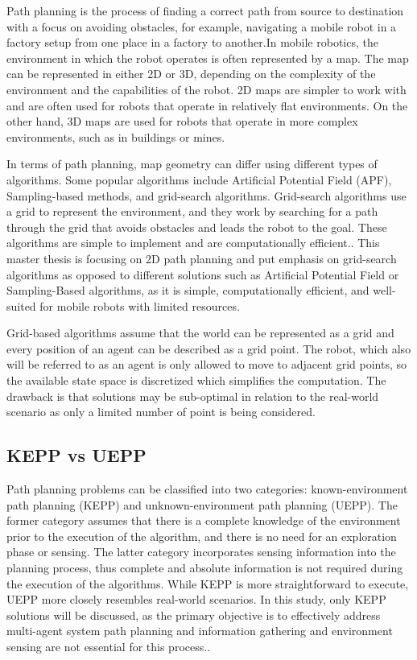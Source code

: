 Path planning is the process of finding a correct path from source to destination with a focus on avoiding obstacles, for example, navigating a mobile robot in a factory setup from one place in a factory to another\cite{path_planning}.In mobile robotics, the environment in which the robot operates is often represented by a map. The map can be represented in either 2D or 3D, depending on the complexity of the environment and the capabilities of the robot. 2D maps are simpler to work with and are often used for robots that operate in relatively flat environments. On the other hand, 3D maps are used for robots that operate in more complex environments, such as in buildings or mines.

In terms of path planning, map geometry can differ using different types of algorithms. Some popular algorithms include Artificial Potential Field (APF), Sampling-based methods, and grid-search algorithms. Grid-search algorithms use a grid to represent the environment, and they work by searching for a path through the grid that avoids obstacles and leads the robot to the goal. These algorithms are simple to implement and are computationally efficient.\cite{not_grid_based}. This master thesis is focusing on 2D path planning and  put emphasis on grid-search algorithms as opposed to different solutions such as Artificial Potential Field or Sampling-Based algorithms, as it is simple, computationally efficient, and well-suited for mobile robots with limited resources.

Grid-based algorithms assume that the world can be represented as a grid and every position of an agent can be described as a grid point. The robot, which also will be referred to as an agent is only allowed to move to adjacent grid points, so the available state space is discretized which simplifies the computation. The drawback is that solutions may be sub-optimal in relation to the real-world scenario as only a limited number of point is being considered\cite{SARANYA2014766}.

\subsection{KEPP vs UEPP}
Path planning problems can be classified into two categories: known-environment path planning (KEPP) and unknown-environment path planning (UEPP). The former category assumes that there is a complete knowledge of the environment prior to the execution of the algorithm, and there is no need for an exploration phase or sensing. The latter category incorporates sensing information into the planning process, thus complete and absolute information is not required during the execution of the algorithms. While KEPP is more straightforward to execute, UEPP more closely resembles real-world scenarios. In this study, only KEPP solutions will be discussed, as the primary objective is to effectively address multi-agent system path planning and information gathering and environment sensing are not essential for this process.\cite{path_planning_protocols}.